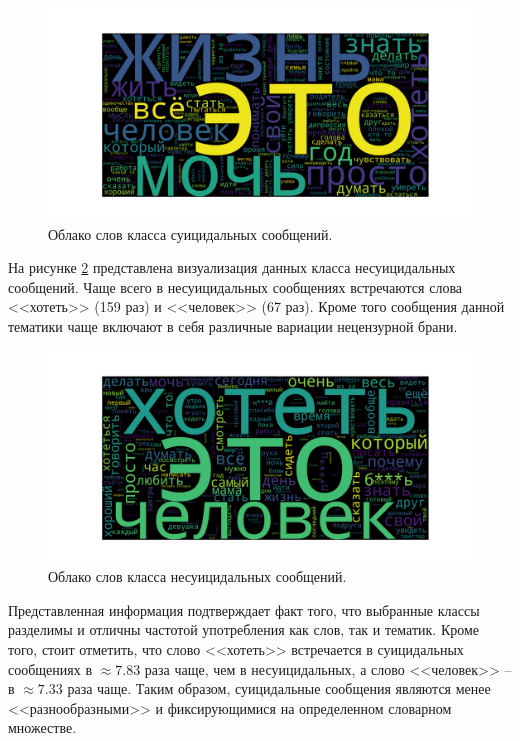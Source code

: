 \begin{figure}[H]
	\centering
	\includegraphics[width=\textwidth]{inc/cloudSuicidal.pdf}
	\caption{ Облако слов класса суицидальных сообщений. }
	\label{img:cloud1}
\end{figure}

На рисунке \ref{img:cloud2} представлена визуализация данных класса несуицидальных сообщений. Чаще всего в несуицидальных сообщениях встречаются слова <<хотеть>> (159 раз) и <<человек>> (67 раз). Кроме того сообщения данной тематики чаще включают в себя различные вариации нецензурной брани.

\begin{figure}[H]
	\centering
	\includegraphics[width=1\textwidth]{inc/cloudNonSuicidal.pdf}
	\caption{ Облако слов класса несуицидальных сообщений. }
	\label{img:cloud2}
\end{figure}

Представленная информация подтверждает факт того, что выбранные классы разделимы и отличны частотой употребления как слов, так и тематик. Кроме того, стоит отметить, что слово <<хотеть>> встречается в суицидальных сообщениях в $\approx 7.83$ раза чаще, чем в несуицидальных, а слово <<человек>> -- в $\approx 7.33$ раза чаще. Таким образом, суицидальные сообщения являются менее <<разнообразными>> и фиксирующимися на определенном словарном множестве.

